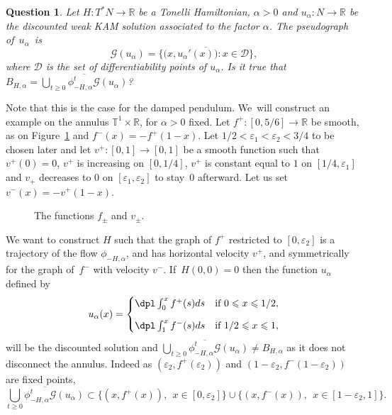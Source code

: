 \documentclass[JEP,XML,SOM,Unicode,NoFloatCountersInSection,published]{cedram}
\newtheorem{question}{Question}
\theoremstyle{definition}
\newcommand{\R}{\mathbb{R}}
\begin{document}
\begin{appendix}
\begin{question}\label{quest:3}
Let $H : T^*N \to \R$ be a Tonelli Hamiltonian, $\alpha>0$ and $u_\alpha : N\to \R$ be the discounted weak KAM solution associated to the factor $\alpha$. The pseudograph of~$u_\alpha $~is
\[
\mathcal G(u_\alpha) = \overline{ \big\{\bigl(x,u_\alpha'(x)\bigr): x\in \mathcal D\big\}},
\]
where $\mathcal D$ is the set of differentiability points of $u_\alpha$. Is it true that $B_{H,\alpha} = \overline{\bigcup_{t\geqslant 0} \phi_{-H,\alpha}^t\mathcal G(u_\alpha)}$?
\end{question}

Note that this is the case for the damped pendulum. We~will construct an example on the annulus $\mathbb T^1\times \R$, for $\alpha>0$ fixed. Let $f^+ : [0,5/6] \to \R$ be smooth, as on Figure~\ref{fig:question3} and $f^-(x) = -f^+(1-x)$.
Let $1/2<\varepsilon_1<\varepsilon_2< 3/4$ to be chosen later and let $v^+: [0,1]\to [0,1]$ be a smooth function such that $v^+(0) = 0$, $v^+ $ is increasing on $[0,1/4]$, $v^+$ is constant equal to $1$ on $[1/4, \varepsilon_1]$ and $v_+$ decreases to $0$ on $[\varepsilon_1,\varepsilon_2]$ to stay~$0$ afterward. Let us set $v^- (x) = -v^+(1-x)$.

\begin{figure}[htb]
\centering
\def\svgwidth{0.8\textwidth}
{\small}
\caption{The functions $f_\pm$ and $v_\pm$.}
\label{fig:question3}
\end{figure}

We want to construct $H$ such that the graph of $f^+$ restricted to $[0,\varepsilon_2]$
is a trajectory of the flow $\phi_{-H,\alpha}$, and has horizontal velocity $v^+$, and symmetrically for the graph of~$f^-$ with velocity $v^-$. If~$H(0,0)=0$ then the function $u_\alpha $ defined by
\[
u_\alpha (x) = \begin{cases}
\dpl\int_{0}^x f^+(s)ds&\text{if } 0\leqslant x\leqslant 1/2,\\[8pt]
\dpl\int_{1}^x f^-(s)ds&\text{if } 1/2\leqslant x\leqslant 1,
\end{cases}
\]
will be the discounted solution and $\overline{\bigcup_{t\geqslant 0} \phi_{-H,\alpha}^t\mathcal G(u_\alpha)}\neq B_{H,\alpha}$ as it does not disconnect the annulus. Indeed as $(\varepsilon_2, f^+(\varepsilon_2))$ and $(1-\varepsilon_2, f^-(1-\varepsilon_2))$ are fixed points,
\[
\overline{\bigcup_{t\geqslant 0} \phi_{-H,\alpha}^t\mathcal G(u_\alpha)} \subset \{(x,f^+(x)) , \ \ x\in [0,\varepsilon_2]\} \cup \{(x,f^-(x)) , \ \ x\in [1-\varepsilon_2, 1]\}.
\]


\end{appendix}
\end{document}
